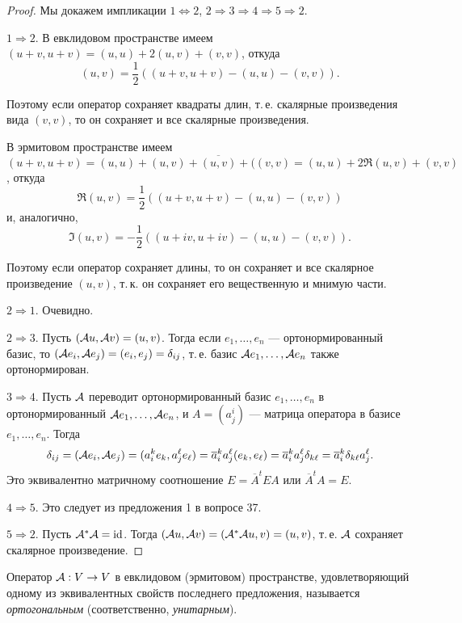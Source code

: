 \begin{proof}
    Мы докажем импликации $1 \Leftrightarrow 2$, $2 \Rightarrow 3 \Rightarrow 4 \Rightarrow 5 \Rightarrow 2$.

    $1 \Rightarrow 2$. В евклидовом пространстве имеем $(u + v, u + v) = (u, u) + 2(u, v) + (v, v)$, откуда
    \[
        (u, v) = \frac{1}{2}((u + v, u + v) - (u, u) - (v, v)).
    \]

    Поэтому если оператор сохраняет квадраты длин, т.\,е. скалярные произведения вида $(v, v)$, то он сохраняет и все скалярные произведения.

    В эрмитовом пространстве имеем $(u + v, u + v) = (u, u) + (u, v) + \overline{(u, v)} + ((v, v) = (u, u) + 2\Re(u, v) + (v, v)$, откуда
    \[
        \Re(u, v) = \frac{1}{2}((u + v, u + v) - (u, u) - (v, v))
    \]
    и, аналогично,
    \[
        \Im(u, v) = -\frac{1}{2}((u + iv, u + iv) - (u, u) - (v, v)).
    \]

    Поэтому если оператор сохраняет длины, то он сохраняет и все скалярное произведение $(u, v)$, т.\,к. он сохраняет его вещественную и мнимую части.

    $2 \Rightarrow 1$. Очевидно.

    $2 \Rightarrow 3$. Пусть $(\mathcal{A} u, \mathcal{A} v) = (u, v)$. Тогда если $e_1, \ldots, e_n$ --- ортонормированный базис, то $(\mathcal{A} e_i, \mathcal{A} e_j) = (e_i, e_j) = \delta_{ij}$, т.\,е. базис $\mathcal{A} e_1, \ldots, \mathcal{A} e_n$ также ортонормирован.
    
    $3 \Rightarrow 4$. Пусть $\mathcal{A}$ переводит ортонормированный базис $e_1, \ldots, e_n$ в ортонормированный $\mathcal{A} e_1, \ldots, \mathcal{A} e_n$, и $A = (a^i_j)$ --- матрица оператора в базисе $e_1, \ldots, e_n$. Тогда
    \[
        \delta_{ij} = (\mathcal{A} e_i, \mathcal{A} e_j) = (a^k_ie_k, a^\ell_je_\ell) = \overline{a}^k_ia^\ell_j(e_k, e_\ell) = \overline{a}^k_ia^\ell_j\delta_{k\ell} = \overline{a}^k_i\delta_{k\ell}a^\ell_j.
    \]
    Это эквивалентно матричному соотношение $E = \overline{A}^tEA$ или $\overline{A}^tA = E$.

    $4 \Rightarrow 5$. Это следует из предложения 1 в вопросе 37.

    $5 \Rightarrow 2$. Пусть $\mathcal{A}^\ast\mathcal{A} = \mathrm{id}$. Тогда $(\mathcal{A} u, \mathcal{A} v) = (\mathcal{A}^\ast\mathcal{A} u, v) = (u, v)$, т.\,е. $\mathcal{A}$ сохраняет скалярное произведение.
\end{proof}

\begin{definition}
    Оператор $\mathcal{A}: V \to V$ в евклидовом (эрмитовом) пространстве, удовлетворяющий одному из эквивалентных свойств последнего предложения, называется \textit{ортогональным} (соответственно, \textit{унитарным}).
\end{definition}

